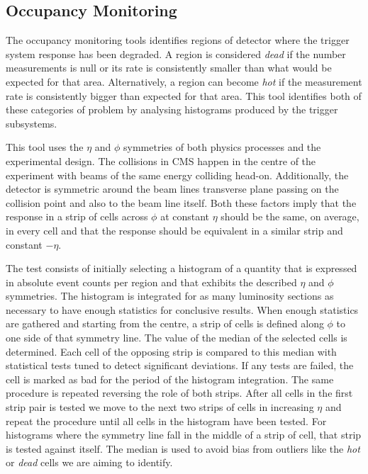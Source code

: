 \subsection{Occupancy Monitoring}


The occupancy monitoring tools  identifies regions of detector where the trigger system response has been degraded. A region is considered \textit{dead} if the number measurements is null or its rate is consistently smaller than what would be expected for that area. Alternatively, a region can become \textit{hot} if the measurement rate is consistently bigger than expected for that area. This tool identifies both of these categories of problem by analysing histograms produced by the trigger subsystems.

This tool uses the $\eta$ and $\phi$ symmetries of both physics processes and the experimental design. The collisions in \gls{CMS} happen in the centre of the experiment with beams of the same energy colliding head-on. Additionally, the detector is symmetric around the beam lines transverse plane passing on the collision point and also to the beam line itself. Both these factors imply that the response in a strip of cells across $\phi$ at constant $\eta$ should be the same, on average, in every cell and that the response should be equivalent in a similar strip and constant $-\eta$.

The test consists of initially selecting a histogram of a quantity that is expressed in absolute event counts per region and that exhibits the described $\eta$ and $\phi$ symmetries. The histogram is integrated for as many luminosity sections as necessary to have enough statistics for conclusive results. When enough statistics are gathered and starting from the centre, a strip of cells is defined along $\phi$ to one side of that symmetry line. The value of the median of the selected cells is determined. Each cell of the opposing strip is compared to this median with statistical tests tuned to detect significant deviations. If any tests are failed, the cell is marked as bad for the period of the histogram integration. The same procedure is repeated reversing the role of both strips. After all cells in the first strip pair is tested we move to the next two strips of cells in increasing $\eta$ and repeat the procedure until all cells in the histogram have been tested. For histograms where the symmetry line fall in the middle of a strip of cell, that strip is tested against itself. The median is used to avoid bias from outliers like the \textit{hot} or \textit{dead} cells we are aiming to identify. 

